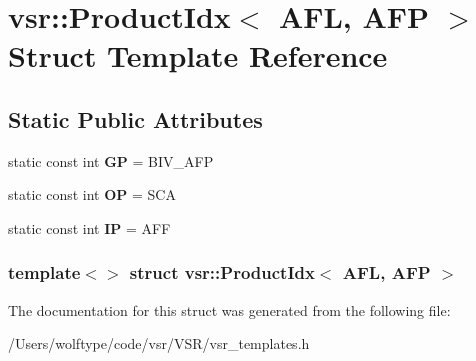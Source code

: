 \hypertarget{structvsr_1_1_product_idx_3_01_a_f_l_00_01_a_f_p_01_4}{\section{vsr\-:\-:Product\-Idx$<$ A\-F\-L, A\-F\-P $>$ Struct Template Reference}
\label{structvsr_1_1_product_idx_3_01_a_f_l_00_01_a_f_p_01_4}
}
\subsection*{Static Public Attributes}
\begin{DoxyCompactItemize}
\item 
\hypertarget{structvsr_1_1_product_idx_3_01_a_f_l_00_01_a_f_p_01_4_a84d2533ef1ca7ec3b1111db075afd007}{static const int {\bfseries G\-P} = B\-I\-V\-\_\-\-A\-F\-P}\label{structvsr_1_1_product_idx_3_01_a_f_l_00_01_a_f_p_01_4_a84d2533ef1ca7ec3b1111db075afd007}

\item 
\hypertarget{structvsr_1_1_product_idx_3_01_a_f_l_00_01_a_f_p_01_4_a75d3082502875e29dd1f89365f8e46f2}{static const int {\bfseries O\-P} = S\-C\-A}\label{structvsr_1_1_product_idx_3_01_a_f_l_00_01_a_f_p_01_4_a75d3082502875e29dd1f89365f8e46f2}

\item 
\hypertarget{structvsr_1_1_product_idx_3_01_a_f_l_00_01_a_f_p_01_4_afcaf36c828cd01934ae67313ab3a224e}{static const int {\bfseries I\-P} = A\-F\-F}\label{structvsr_1_1_product_idx_3_01_a_f_l_00_01_a_f_p_01_4_afcaf36c828cd01934ae67313ab3a224e}

\end{DoxyCompactItemize}
\subsubsection*{template$<$$>$ struct vsr\-::\-Product\-Idx$<$ A\-F\-L, A\-F\-P $>$}



The documentation for this struct was generated from the following file\-:\begin{DoxyCompactItemize}
\item 
/\-Users/wolftype/code/vsr/\-V\-S\-R/vsr\-\_\-templates.\-h\end{DoxyCompactItemize}
